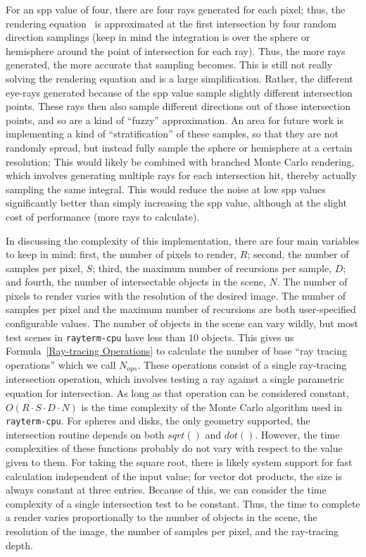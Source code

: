 For an spp value of four, there are four rays generated for each pixel; thus, the rendering equation~\cite{kajiya1986rendering} is approximated at the first intersection by four random direction samplings (keep in mind the integration is over the sphere or hemisphere around the point of intersection for each ray).
Thus, the more rays generated, the more accurate that sampling becomes.
This is still not really solving the rendering equation and is a large simplification.
Rather, the different eye-rays generated because of the spp value sample slightly different intersection points.
These rays then also sample different directions out of those intersection points, and so are a kind of ``fuzzy'' approximation.
An area for future work is implementing a kind of ``stratification'' of these samples, so that they are not randomly spread, but instead fully sample the sphere or hemisphere at a certain resolution;
This would likely be combined with branched Monte Carlo rendering, which involves generating multiple rays for each intersection hit, thereby actually sampling the same integral.
This would reduce the noise at low spp values significantly better than simply increasing the spp value, although at the slight cost of performance (more rays to calculate).


In discussing the complexity of this implementation, there are four main variables to keep in mind: first, the number of pixels to render, $R$; second, the number of samples per pixel, $S$; third, the maximum number of recursions per sample, $D$; and fourth, the number of intersectable objects in the scene, $N$.
The number of pixels to render varies with the resolution of the desired image.
The number of samples per pixel and the maximum number of recursions are both user-specified configurable values.
The number of objects in the scene can vary wildly, but most test scenes in \texttt{rayterm-cpu} have less than $10$ objects.
This gives us Formula~\ref{Ray-tracing Operations} to calculate the number of base ``ray tracing operations'' which we call $N_{ops}$.
These operations consist of a single ray-tracing intersection operation, which involves testing a ray against a single parametric equation for intersection.
As long as that operation can be considered constant, $O(R \cdot S \cdot D \cdot N)$ is the time complexity of the Monte Carlo algorithm used in \texttt{rayterm-cpu}.
For spheres and disks, the only geometry supported, the intersection routine depends on both $sqrt()$ and $dot()$.
However, the time complexities of these functions probably do not vary with respect to the value given to them.
For taking the square root, there is likely system support for fast calculation independent of the input value; for vector dot products, the size is always constant at three entries.
Because of this, we can consider the time complexity of a single intersection test to be constant.
Thus, the time to complete a render varies proportionally to the number of objects in the scene, the resolution of the image, the number of samples per pixel, and the ray-tracing depth.

